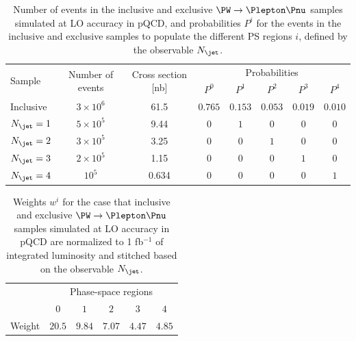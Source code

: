 \begin{table}[h!]
\begin{center}
\begin{tabular}{l|c|c|ccccc}
\hline
\multirow{2}{20mm}{Sample} & \multirow{2}{*}{Number of events} & \multirow{2}{*}{Cross section [nb]} & \multicolumn{5}{c}{Probabilities}               \\
                           &                                   &                                     & $P^{0}$ & $P^{1}$ & $P^{2}$ & $P^{3}$ & $P^{4}$ \\
\hline
\hline
Inclusive                  & $3 \times 10^{6}$ & 61.5 & $0.765$ & $0.153$ & $0.053$ & $0.019$ & $0.010$ \\
\hline
$N_{\jet} = 1$             & $5 \times 10^{5}$ & 9.44  & $0$     & $1$     & $0$     & $0$     & $0$     \\
$N_{\jet} = 2$             & $3 \times 10^{5}$ & 3.25  & $0$     & $0$     & $1$     & $0$     & $0$     \\
$N_{\jet} = 3$             & $2 \times 10^{5}$ & 1.15  & $0$     & $0$     & $0$     & $1$     & $0$     \\
$N_{\jet} = 4$             & $         10^{5}$ & 0.634 & $0$     & $0$     & $0$     & $0$     & $1$     \\
\hline
\end{tabular}
\end{center}
\caption{
  Number of events in the inclusive and exclusive $\PW \to \Plepton\Pnu$ samples simulated at LO accuracy in pQCD,
  and probabilities $P^{i}$ for the events in the inclusive and exclusive samples to populate the different PS regions $i$,
  defined by the observable $N_{\jet}$.
}
\label{tab:samples_and_probabilities_WJets_vs_Njet}
\end{table}

\begin{table}[h!]
\begin{center}
\begin{tabular}{l|ccccc}
\hline
 & \multicolumn{5}{c}{Phase-space regions} \\
 & $0$ & $1$ & $2$ & $3$ & $4$ \\
\hline
\hline
Weight & $20.5$ & $9.84$ & $7.07$ & $4.47$ & $4.85$ \\
\hline
\end{tabular}
\end{center}
\caption{
  Weights $w^{i}$ for the case that inclusive and exclusive $\PW \to \Plepton\Pnu$ samples simulated at LO accuracy in pQCD
  are normalized to 1 fb${}^{-1}$ of integrated luminosity and stitched based on the observable $N_{\jet}$.
}
\label{tab:weights_WJets_vs_Njet}
\end{table}

